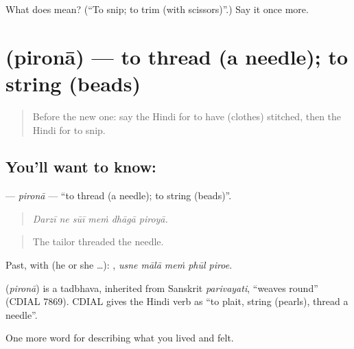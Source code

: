 \begin{tcolorbox}[breakable,colback=teal!4,colframe=teal!35!black,title={Before you move on}]
What does  mean? (\textquotedblleft{}To snip; to trim (with scissors)\textquotedblright{}.) Say it once more.
\end{tcolorbox}
\section[\texorpdfstring{\hi{पिरोना} (pironā)}{पिरोना (pironā)}]{ (pironā) — to thread (a needle); to string (beads)}

\label{lesson:HI-C513-pirona}



\begin{quote}
Before the new one: say the Hindi for to have (clothes) stitched, then the Hindi for to snip.
\end{quote}

\subsection*{You'll want to know: }
\textbf{} — \emph{pironā} — \textquotedblleft{}to thread (a needle); to string (beads)\textquotedblright{}.

\begin{quote}
     
\end{quote}

\begin{quote}
\emph{Darzī ne sūī meṁ dhāgā piroyā.}
\end{quote}

\begin{quote}
The tailor threaded the needle.
\end{quote}

Past, with  (he or she …):     , \emph{usne mālā meṁ phūl piroe}.

\begin{cousinweb}
\textbf{} (\emph{pironā}) is a tadbhava, inherited from Sanskrit \emph{parivayati}, \textquotedblleft{}weaves round\textquotedblright{} (CDIAL 7869). CDIAL gives the Hindi verb as \textquotedblleft{}to plait, string (pearls), thread a needle\textquotedblright{}.
\end{cousinweb}

\begin{grammarlens}[title={What you've built}]
One more word for describing what you lived and felt.
\end{grammarlens}

